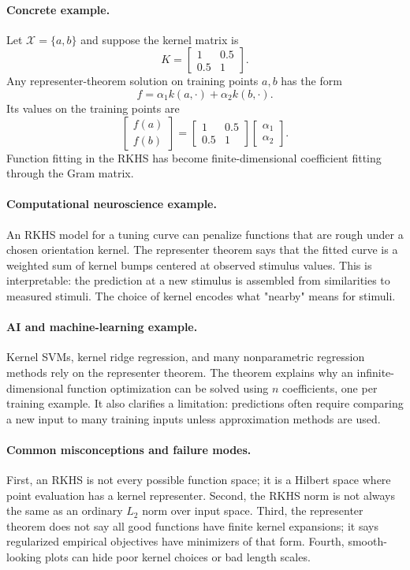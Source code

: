 \paragraph{Concrete example.}
Let \(\mathcal X=\{a,b\}\) and suppose the kernel matrix is
\[
K=
\begin{bmatrix}
1 & 0.5\\
0.5 & 1
\end{bmatrix}.
\]
Any representer-theorem solution on training points \(a,b\) has the form
\[
f=\alpha_1 k(a,\cdot)+\alpha_2 k(b,\cdot).
\]
Its values on the training points are
\[
\begin{bmatrix}
f(a)\\
f(b)
\end{bmatrix}
=
\begin{bmatrix}
1 & 0.5\\
0.5 & 1
\end{bmatrix}
\begin{bmatrix}
\alpha_1\\
\alpha_2
\end{bmatrix}.
\]
Function fitting in the RKHS has become finite-dimensional coefficient fitting through the Gram matrix.

\paragraph{Computational neuroscience example.}
An RKHS model for a tuning curve can penalize functions that are rough under a chosen orientation kernel. The representer theorem says that the fitted curve is a weighted sum of kernel bumps centered at observed stimulus values. This is interpretable: the prediction at a new stimulus is assembled from similarities to measured stimuli. The choice of kernel encodes what "nearby" means for stimuli.

\paragraph{AI and machine-learning example.}
Kernel SVMs, kernel ridge regression, and many nonparametric regression methods rely on the representer theorem. The theorem explains why an infinite-dimensional function optimization can be solved using \(n\) coefficients, one per training example. It also clarifies a limitation: predictions often require comparing a new input to many training inputs unless approximation methods are used.

\paragraph{Common misconceptions and failure modes.}
First, an RKHS is not every possible function space; it is a Hilbert space where point evaluation has a kernel representer. Second, the RKHS norm is not always the same as an ordinary \(L_2\) norm over input space. Third, the representer theorem does not say all good functions have finite kernel expansions; it says regularized empirical objectives have minimizers of that form. Fourth, smooth-looking plots can hide poor kernel choices or bad length scales.

